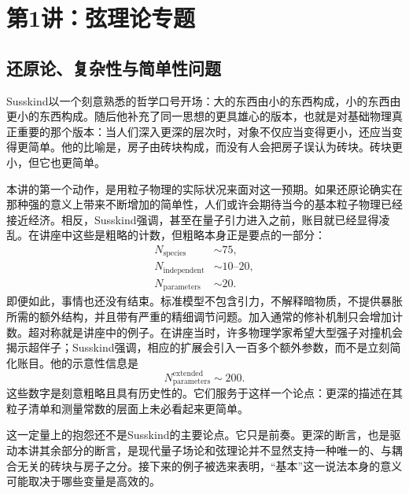 \chapter{第1讲：弦理论专题}


\section{还原论、复杂性与简单性问题}

Susskind以一个刻意熟悉的哲学口号开场：大的东西由小的东西构成，小的东西由更小的东西构成。随后他补充了同一思想的更具雄心的版本，也就是对基础物理真正重要的那个版本：当人们深入更深的层次时，对象不仅应当变得更小，还应当变得更简单。他的比喻是，房子由砖块构成，而没有人会把房子误认为砖块。砖块更小，但它也更简单。

本讲的第一个动作，是用粒子物理的实际状况来面对这一预期。如果还原论确实在那种强的意义上带来不断增加的简单性，人们或许会期待当今的基本粒子物理已经接近经济。相反，Susskind强调，甚至在量子引力进入之前，账目就已经显得凌乱。在讲座中这些是粗略的计数，但粗略本身正是要点的一部分：
\begin{equation}
\begin{aligned}
N_{\mathrm{species}}&\sim 75,\\
N_{\mathrm{independent}}&\sim 10\text{--}20,\\
N_{\mathrm{parameters}}&\sim 20.
\end{aligned}
\end{equation}
即便如此，事情也还没有结束。标准模型不包含引力，不解释暗物质，不提供暴胀所需的额外结构，并且带有严重的精细调节问题。加入通常的修补机制只会增加计数。超对称就是讲座中的例子。在讲座当时，许多物理学家希望大型强子对撞机会揭示超伴子；Susskind强调，相应的扩展会引入一百多个额外参数，而不是立刻简化账目。他的示意性信息是
\begin{equation}
N_{\mathrm{parameters}}^{\mathrm{extended}} \sim 200.
\end{equation}
这些数字是刻意粗略且具有历史性的。它们服务于这样一个论点：更深的描述在其粒子清单和测量常数的层面上未必看起来更简单。

这一定量上的抱怨还不是Susskind的主要论点。它只是前奏。更深的断言，也是驱动本讲其余部分的断言，是现代量子场论和弦理论并不显然支持一种唯一的、与耦合无关的砖块与房子之分。接下来的例子被选来表明，``基本''这一说法本身的意义可能取决于哪些变量是高效的。

